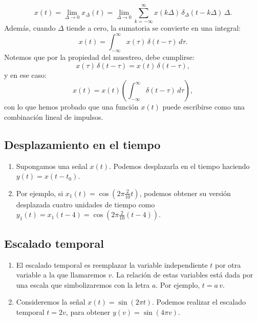 \documentclass[11pt,a4paper,openany]{book}
\begin{document}
\begin{equation}
	x(t) = \lim_{\Delta \to 0} x_{\Delta}(t) = \lim_{\Delta \to 0} \sum_{k=-\infty}^{\infty} x(k\Delta) \, \delta_{\Delta}(t-k\Delta) \, \Delta .
\end{equation}
Además, cuando $\Delta$ tiende a cero, la sumatoria se convierte en una integral:
\begin{equation}
	x(t) = \int_{-\infty}^{\infty} x(\tau) \, \delta(t-\tau) \, d\tau .
\end{equation}
Notemos que por la propiedad del muestreo, debe cumplirse:
\begin{equation}
	x(\tau) \, \delta(t-\tau) = x(t) \, \delta(t-\tau) ,
\end{equation}
y en ese caso:
\begin{equation}
	x(t) = x(t) \left( \int_{-\infty}^{\infty} \delta(t-\tau) \, d\tau \right),
\end{equation}
con lo que hemos probado que una función $x(t)$ puede escribirse
como una combinación lineal de impulsos.

\subsection{Desplazamiento en el tiempo}

\begin{enumerate}
	\item Supongamos una señal $x(t)$. Podemos desplazarla en el tiempo
	haciendo $y(t) = x(t - t_{0})$.
	\item Por ejemplo, si $x_{1}(t) = \cos(2\pi \frac{2}{10} t)$,
	podemos obtener su versión desplazada cuatro unidades de tiempo como
	$y_{1}(t) = x_{1}(t - 4) =  \cos(2\pi \frac{2}{10} (t - 4))$.
\end{enumerate}


\subsection{Escalado temporal}

\begin{enumerate}
	\item El escalado temporal es reemplazar la variable independiente $t$
	por otra variable a la que llamaremos $v$. La relación de estas
	variables está dada por una escala que simbolizaremos con la letra
	$a$. Por ejemplo, $t = a \, v$.
	
	\item Consideremos la señal $x(t) = \sin(2\pi t)$. Podemos
	realizar el escalado temporal $t = 2v$, para obtener $y(v) =
	\sin(4\pi v)$.
\end{enumerate}
\end{document}
